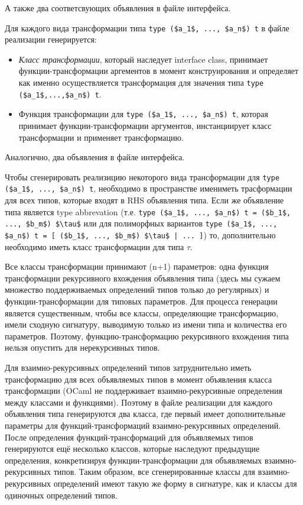 \documentclass[acmsmall,review,anonymous]{acmart}\settopmatter{printfolios=true,printccs=false,printacmref=false}
\begin{document}
А также два соответсвующих объявления в файле интерфейса.


Для каждого вида трансформации типа \lstinline{type ($a_1$, ..., $a_n$) t} в файле реализации генерируется:
\begin{itemize}
 \item \textit{Класс трансформации}, который наследует interface class, принимает функции-трансформации аргементов в момент конструирования и 
	определяет как именно осуществляется трансформация для значения типа \lstinline{type ($a_1$,...,$a_n$) t}.
 \item Функция трансформации для \lstinline{type ($a_1$, ..., $a_n$) t}, которая принимает функции-трансформации аргументов, инстанциирует
	класс трансформации и применяет трансформацию.
\end{itemize}
Аналогично, два объявления в файле интерфейса.

Чтобы сгенерировать реализицию некоторого вида трансформации для \lstinline{type ($a_1$, ..., $a_n$) t}, необходимо в пространстве имениметь 
трасформации для всех типов, которые входят в RHS объявления типа. Если же объявление типа является type abbrevation (т.е. 
 \lstinline{type ($a_1$, ..., $a_n$) t = ($b_1$, ..., $b_m$) $\tau$} или для полиморфных вариантов 
 \lstinline{type ($a_1$, ..., $a_n$) t = [ ($b_1$, ..., $b_m$) $\tau$ | ... ]}) 
 то, дополнительно необходимо иметь класс трансформации для типа
 $\tau$.

Все классы трансформации принимают (n+1) параметров: одна функция трансформации рекурсивного вхождения объявления типа 
(здесь мы сужаем множество поддерживаемых определений типов только до регулярных) и функции-трансформации для типовых параметров. Для процесса
генерации является существенным, чтобы все классы, определяющие трансформацию, имели сходную сигнатуру, выводимую только из имени типа 
и количества его параметров. Поэтому, функцию-трансформацию рекурсивного вхождения типа нельзя опустить для нерекурсивных типов.

Для взаимно-рекурсивных определений типов затруднительно иметь трансформацию для всех объявляемых типов в момент объявления класса 
трансформации (OCaml не поддерживает взаимно-рекурсивные определения между классами и функциями). Поэтому в файле реализации 
для каждого объявления типа генерируются два класса, где первый имеет дополнительные параметры для функций-трансформаций
взаимно-рекурсивных определений. После определения функций-трансформаций для объявляемых типов генерируются ещё несколько классов,
которые наследуют предыдущие определения, конкретизируя функции-трансформации для объявляемых взаимно-рекурсивных типов. 
Таким образом, все сгенерированные классы для взаимно-рекурсивных определений имеют такую же форму в сигнатуре, как и классы для
одиночных определений типов.
\end{document}
